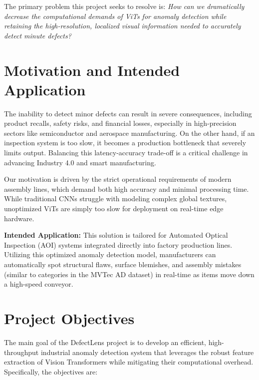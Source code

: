 \documentclass[12pt]{article}
\begin{document}
The primary problem this project seeks to resolve is: \textit{How can we dramatically decrease the computational demands of ViTs for anomaly detection while retaining the high-resolution, localized visual information needed to accurately detect minute defects?}

\section{Motivation and Intended Application}
The inability to detect minor defects can result in severe consequences, including product recalls, safety risks, and financial losses, especially in high-precision sectors like semiconductor and aerospace manufacturing. On the other hand, if an inspection system is too slow, it becomes a production bottleneck that severely limits output. Balancing this latency-accuracy trade-off is a critical challenge in advancing Industry 4.0 and smart manufacturing.

Our motivation is driven by the strict operational requirements of modern assembly lines, which demand both high accuracy and minimal processing time. While traditional CNNs struggle with modeling complex global textures, unoptimized ViTs are simply too slow for deployment on real-time edge hardware.

\textbf{Intended Application:} This solution is tailored for Automated Optical Inspection (AOI) systems integrated directly into factory production lines. Utilizing this optimized anomaly detection model, manufacturers can automatically spot structural flaws, surface blemishes, and assembly mistakes (similar to categories in the MVTec AD dataset) in real-time as items move down a high-speed conveyor.

\section{Project Objectives}
The main goal of the DefectLens project is to develop an efficient, high-throughput industrial anomaly detection system that leverages the robust feature extraction of Vision Transformers while mitigating their computational overhead. Specifically, the objectives are:
\end{document}
